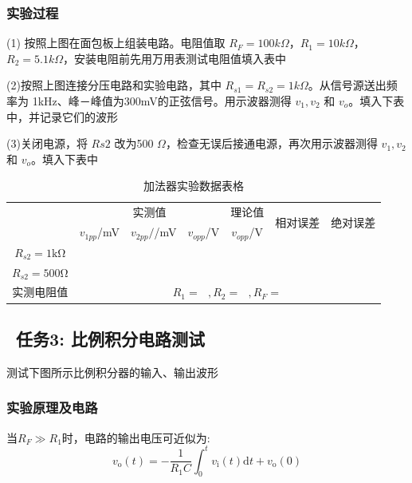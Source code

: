 \documentclass[a4paper,11pt,UTF8]{article}
\begin{document}
\subsubsection{实验过程}

(1) 按照上图在面包板上组装电路。电阻值取 $R_F = 100k\Omega$，$R_1 = 10k\Omega$，
$R_2 = 5.1k\Omega$，安装电阻前先用万用表测试电阻值填入表中

(2)按照上图连接分压电路和实验电路，其中 $R_{s1} = R_{s2} = 1k\Omega$。从信号源送出频率为
1kHz、峰－峰值为300mV的正弦信号。用示波器测得 $v_1,v_2$ 和 $v_o$。填入下表中，并记录它们的波形

(3)关闭电源，将 $Rs2$ 改为500 $\Omega$，检查无误后接通电源，再次用示波器测得 $v_1,v_2$ 
和 $v_o$。填入下表中

\begin{table}[h]
	\centering
	\caption{加法器实验数据表格}
	\label{table2}
	\begin{tabular}{|c|c|c|c|c|c|c|}
		\hline
		\multirow{2}{*}{}   & \multicolumn{3}{c|}{实测值} & 理论值 &
		\multirow{2}{*}{相对误差} & 
		\multirow{2}{*}{绝对误差}\\
		\cline{2-5}
		\multirow{2}{*}{} & $v_{1pp}$/mV & $v_{2pp}/$/mV & $v_{opp}$/V & $v_{opp}$/V & 
		\multirow{2}{*}{} &
		\multirow{2}{*}{}\\
		\hline
		$R_{s2}=1\mathrm{k\Omega}$ &  &  &  &  &  &  \\
		\hline
		$R_{s2}=500\mathrm{\Omega}$ &  &  &  &  &  &  \\
		\hline
		实测电阻值 & \multicolumn{6}{c|}{$R_1= \ \ \ ,R_2= \ \ \ , R_F=$}\\
		\hline
	\end{tabular}
\end{table}

\subsection{ \ 任务3: 比例积分电路测试}
测试下图所示比例积分器的输入、输出波形

\subsubsection{实验原理及电路}
当$R_F\gg R_1$时，电路的输出电压可近似为:
$$
	v_{\mathrm{o}}(t)=-\frac{1}{R_{1}C}\int_{0}^{t}v_{\mathrm{i}}(t)\mathrm{d}t+v_{\mathrm{o}}(0)
$$
\end{document}
